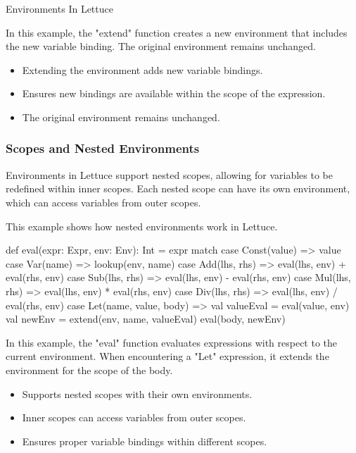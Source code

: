 \begin{notes}{Environments In Lettuce}
\begin{highlight}
        In this example, the "extend" function creates a new environment that includes the new variable binding. The original environment remains unchanged.
        
        \begin{itemize}
            \item Extending the environment adds new variable bindings.
            \item Ensures new bindings are available within the scope of the expression.
            \item The original environment remains unchanged.
        \end{itemize}
    
    \end{highlight}
    
    \subsubsection*{Scopes and Nested Environments}
    
    Environments in Lettuce support nested scopes, allowing for variables to be redefined within inner scopes. Each nested scope can have its own environment, which can access variables from outer scopes.
    
    \begin{highlight}
    
        This example shows how nested environments work in Lettuce.
    
    \begin{code}[Scala]
    def eval(expr: Expr, env: Env): Int = expr match {
        case Const(value) => value
        case Var(name) => lookup(env, name)
        case Add(lhs, rhs) => eval(lhs, env) + eval(rhs, env)
        case Sub(lhs, rhs) => eval(lhs, env) - eval(rhs, env)
        case Mul(lhs, rhs) => eval(lhs, env) * eval(rhs, env)
        case Div(lhs, rhs) => eval(lhs, env) / eval(rhs, env)
        case Let(name, value, body) => 
            val valueEval = eval(value, env)
            val newEnv = extend(env, name, valueEval)
            eval(body, newEnv)
    }
    \end{code}
    
        In this example, the "eval" function evaluates expressions with respect to the current environment. When encountering a "Let" expression, it extends the environment for the scope of the body.
    
        \begin{itemize}
            \item Supports nested scopes with their own environments.
            \item Inner scopes can access variables from outer scopes.
            \item Ensures proper variable bindings within different scopes.
        \end{itemize}
    

\end{highlight}
\end{notes}

